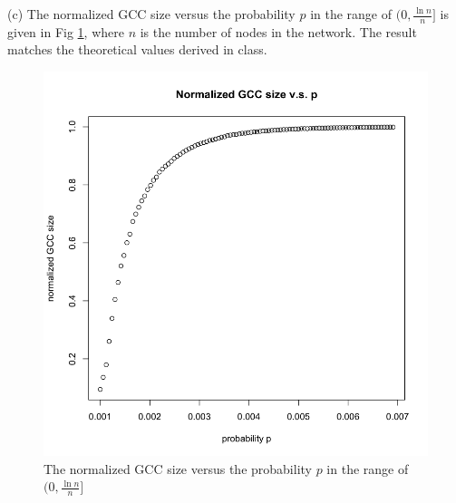 \documentclass[draftcls,12pt,onecolumn]{IEEEtran}
\begin{document}
(c) The normalized GCC size versus the probability $p$ in the range of $(0,\frac{\ln n}{n}]$ is given in Fig \ref{fig11}, where $n$ is the number of nodes in the network. The result matches the theoretical values derived in class.
\begin{figure}[H]
\centering
\includegraphics[scale=0.3]{figures_part1_1/output_18_0.png}
\caption{The normalized GCC size versus the probability $p$ in the range of $(0,\frac{\ln n}{n}]$}
\label{fig11}
\end{figure}
\end{document}
